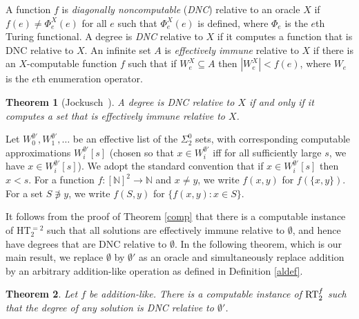 \documentclass{amsart}
\newtheorem{thm}{Theorem}[section]
\theoremstyle{definition}
\begin{document}
A function $f$ is \emph{diagonally noncomputable} (\emph{DNC})
relative to an oracle $X$ if $f(e) \neq \Phi^X_e(e)$ for all $e$ such
that $\Phi^X_e(e)$ is defined, where $\Phi_e$ is the $e$th Turing
functional. A degree is \emph{DNC} relative to $X$ if it computes a
function that is DNC relative to $X$. An infinite set $A$ is
\emph{effectively immune} relative to $X$ if there is an
$X$-computable function $f$ such that if $W^X_e \subseteq A$ then
$|W^X_e| < f(e)$, where $W_e$ is the $e$th enumeration operator.

\begin{thm}[Jockusch~\cite{Jfpf}]
\label{Jthm}
A degree is DNC relative to $X$ if and only if it computes a set that
is effectively immune relative to $X$.
\end{thm}
 
Let $W^{\emptyset'}_0,W^{\emptyset'}_1,\ldots$ be an effective list of
the $\Sigma^0_2$ sets, with corresponding computable approximations
$W^{\emptyset'}_i[s]$ (chosen so that $x \in W^{\emptyset'}_i$ if{}f
for all sufficiently large $s$, we have $x \in
W^{\emptyset'}_i[s]$). We adopt the standard convention that if $x \in
W^{\emptyset'}_i[s]$ then $x < s$. For a function $f : [\mathbb N]^2
\rightarrow \mathbb N$ and $x \neq y$, we write $f(x,y)$ for
$f(\{x,y\})$. For a set $S \not\ni y$, we write $f(S,y)$ for $\{f(x,y)
: x \in S\}$.

It follows from the proof of Theorem \ref{comp} that there is a
computable instance of HT$^{=2}_2$ such that all solutions are
effectively immune relative to $\emptyset$, and hence have degrees
that are DNC relative to $\emptyset$. In the following theorem, which
is our main result, we replace $\emptyset$ by $\emptyset'$ as an
oracle and simultaneously replace addition by an arbitrary
addition-like operation as defined in Definition \ref{aldef}.

\begin{thm}
\label{main}
Let $f$ be addition-like. There is a computable instance of
$\textup{RT}^f_2$ such that the degree of any solution is DNC relative
to $\emptyset'$.
\end{thm}
\end{document}
